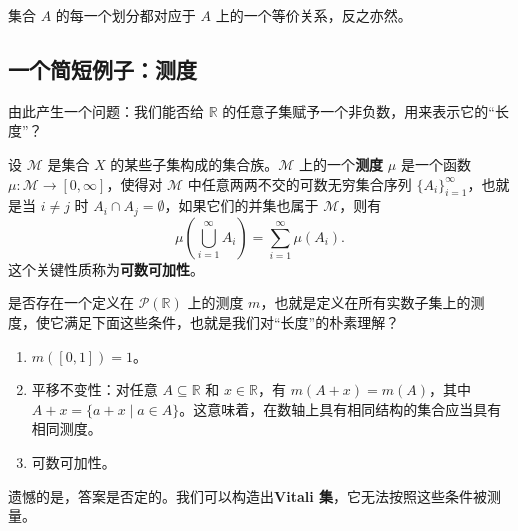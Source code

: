 \begin{theorem}
集合 $A$ 的每一个划分都对应于 $A$ 上的一个等价关系，反之亦然。
\end{theorem}

\subsection{一个简短例子：测度}

由此产生一个问题：我们能否给 $\mathbb{R}$ 的任意子集赋予一个非负数，用来表示它的“长度”？

\begin{definition}[测度]
设 $\mathcal{M}$ 是集合 $X$ 的某些子集构成的集合族。$\mathcal{M}$ 上的一个\textbf{测度} $\mu$ 是一个函数 $\mu:\mathcal{M}\to[0,\infty]$，使得对 $\mathcal{M}$ 中任意两两不交的可数无穷集合序列 $\{A_i\}_{i=1}^{\infty}$，也就是当 $i\ne j$ 时 $A_i\cap A_j=\emptyset$，如果它们的并集也属于 $\mathcal{M}$，则有
\[
\mu\left(\bigcup_{i=1}^{\infty}A_i\right)=\sum_{i=1}^{\infty}\mu(A_i).
\]
这个关键性质称为\textbf{可数可加性}。
\end{definition}

是否存在一个定义在 $\mathcal{P}(\mathbb{R})$ 上的测度 $m$，也就是定义在所有实数子集上的测度，使它满足下面这些条件，也就是我们对“长度”的朴素理解？
\begin{enumerate}
    \item $m([0,1])=1$。
    \item 平移不变性：对任意 $A\subseteq\mathbb{R}$ 和 $x\in\mathbb{R}$，有 $m(A+x)=m(A)$，其中 $A+x=\{a+x\mid a\in A\}$。这意味着，在数轴上具有相同结构的集合应当具有相同测度。
    \item 可数可加性。
\end{enumerate}

遗憾的是，答案是否定的。我们可以构造出\textbf{Vitali 集}，它无法按照这些条件被测量。

